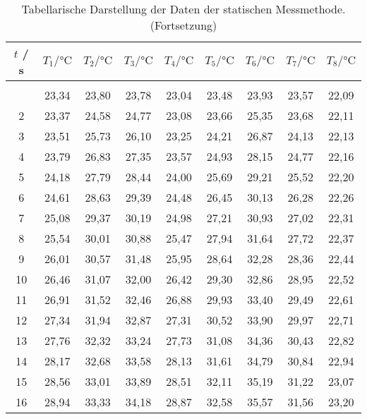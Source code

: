       \begin{longtable}{c c c c c c c c c}
        \caption{Tabellarische Darstellung der Daten der statischen Messmethode.}\label{tab:data statisch}\\
        \hline
        {$t$ / s} & {$T_{1} / \unit{\celsius}$} & {$T_{2} / \unit{\celsius}$} &%
        {$T_{3} / \unit{\celsius}$} & {$T_{4} / \unit{\celsius}$} &%
        {$T_{5} / \unit{\celsius}$} & {$T_{6} / \unit{\celsius}$} &%
        {$T_{7} / \unit{\celsius}$} & {$T_{8} / \unit{\celsius}$} \\
        \hline
        \endfirsthead
        \caption[]{Tabellarische Darstellung der Daten der statischen Messmethode. (Fortsetzung)}\\
        \hline
        \endhead
        \hline
        \endfoot
      1	  & 23,34	& 23,80	& 23,78	& 23,04	& 23,48	& 23,93	& 23,57	& 22,09 \\
      2	  & 23,37	& 24,58	& 24,77	& 23,08	& 23,66	& 25,35	& 23,68	& 22,11 \\
      3	  & 23,51	& 25,73	& 26,10	& 23,25	& 24,21	& 26,87	& 24,13	& 22,13 \\
      4	  & 23,79	& 26,83	& 27,35	& 23,57	& 24,93	& 28,15	& 24,77	& 22,16 \\
      5	  & 24,18	& 27,79	& 28,44	& 24,00	& 25,69	& 29,21	& 25,52	& 22,20 \\
      6	  & 24,61	& 28,63	& 29,39	& 24,48	& 26,45	& 30,13	& 26,28	& 22,26 \\
      7	  & 25,08	& 29,37	& 30,19	& 24,98	& 27,21	& 30,93	& 27,02	& 22,31 \\
      8	  & 25,54	& 30,01	& 30,88	& 25,47	& 27,94	& 31,64	& 27,72	& 22,37 \\
      9	  & 26,01	& 30,57	& 31,48	& 25,95	& 28,64	& 32,28	& 28,36	& 22,44 \\
      10	& 26,46	& 31,07	& 32,00	& 26,42	& 29,30	& 32,86	& 28,95	& 22,52 \\
      11	& 26,91	& 31,52	& 32,46	& 26,88	& 29,93	& 33,40	& 29,49	& 22,61 \\
      12	& 27,34	& 31,94	& 32,87	& 27,31	& 30,52	& 33,90	& 29,97	& 22,71 \\
      13	& 27,76	& 32,32	& 33,24	& 27,73	& 31,08	& 34,36	& 30,43	& 22,82 \\
      14	& 28,17	& 32,68	& 33,58	& 28,13	& 31,61	& 34,79	& 30,84	& 22,94 \\
      15	& 28,56	& 33,01	& 33,89	& 28,51	& 32,11	& 35,19	& 31,22	& 23,07 \\
      16	& 28,94	& 33,33	& 34,18	& 28,87	& 32,58	& 35,57	& 31,56	& 23,20 \\

\end{longtable}
